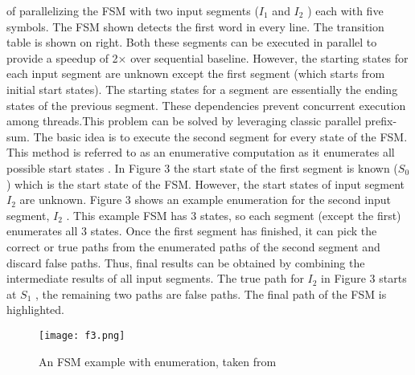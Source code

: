 of parallelizing the FSM with two input segments ($I_1$ and $I_2$ ) each
with five symbols. The FSM shown detects the first word in every
line. The transition table is shown on right. Both these segments can
be executed in parallel to provide a speedup of 2× over sequential
baseline.
However, the starting states for each input segment are unknown
except the first segment (which starts from initial start states). The
starting states for a segment are essentially the ending states of the previous segment. These dependencies prevent concurrent execution
among threads.This problem can be solved by leveraging classic
parallel prefix-sum. The basic idea is to execute the second
segment for every state of the FSM. This method is referred to
as an enumerative computation as it enumerates all possible start
states \cite{2}.
In Figure 3 the start state of the first segment is known ($S_0$)
which is the start state of the FSM. However, the start states of input
segment $I_2$ are unknown. Figure 3 shows an example enumeration
for the second input segment, $I_2$ . This example FSM has 3 states,
so each segment (except the first) enumerates all 3 states. Once the
first segment has finished, it can pick the correct or true paths from
the enumerated paths of the second segment and discard false paths.
Thus, final results can be obtained by combining the intermediate
results of all input segments. The true path for $I_2$ in Figure 3 starts
at $S_1$ , the remaining two paths are false paths. The final path of the
FSM is highlighted.
\begin{figure}[!h]
    \texttt{[image: f3.png]}
    \caption{An FSM example with enumeration, taken from \cite{1}}
\end{figure}